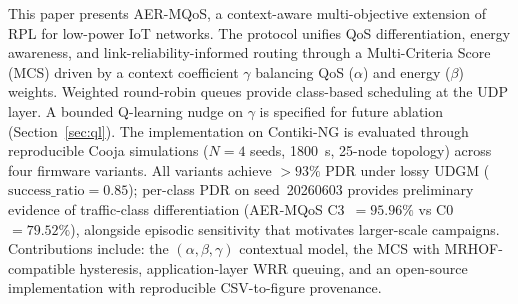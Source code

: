 This paper presents AER-MQoS, a context-aware multi-objective extension of RPL for low-power IoT networks. The protocol unifies QoS differentiation, energy awareness, and link-reliability-informed routing through a Multi-Criteria Score (MCS) driven by a context coefficient $\gamma$ balancing QoS ($\alpha$) and energy ($\beta$) weights. Weighted round-robin queues provide class-based scheduling at the UDP layer. A bounded Q-learning nudge on $\gamma$ is specified for future ablation (Section~\ref{sec:ql}). The implementation on Contiki-NG is evaluated through reproducible Cooja simulations ($N{=}4$ seeds, 1800~s, 25-node topology) across four firmware variants. All variants achieve $>93\%$ PDR under lossy UDGM ($\mathrm{success\_ratio}{=}0.85$); per-class PDR on seed~20260603 provides preliminary evidence of traffic-class differentiation (AER-MQoS C3~$=95.96\%$ vs C0~$=79.52\%$), alongside episodic sensitivity that motivates larger-scale campaigns. Contributions include: the $(\alpha,\beta,\gamma)$ contextual model, the MCS with MRHOF-compatible hysteresis, application-layer WRR queuing, and an open-source implementation with reproducible CSV-to-figure provenance.
